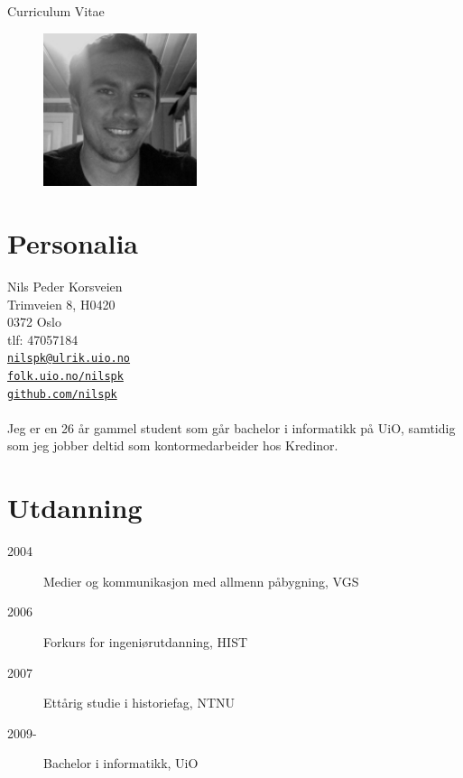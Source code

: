\documentclass[margin,line,a4paper]{resume}
\begin{document}
{\sc \Large Curriculum Vitae}
\begin{resume}
\vspace{0.5cm}
\begin{figure}
\vspace{-1cm}
\begin{center}
\includegraphics[width=0.4\textwidth]{me}
\end{center}
\vspace{-1cm}
\end{figure}

\section{\mysidestyle Personalia}%
Nils Peder Korsveien \\
Trimveien 8, H0420 \\
0372 Oslo \\
tlf: 47057184 \\
\href{mailto:nilspk@ulrik.uio.no}{\tt{nilspk@ulrik.uio.no}}\\
\href{http://folk.uio.no/nilspk}{\tt{folk.uio.no/nilspk}}\\
\href{http://github.com/nilspk}{\tt{github.com/nilspk}}\\
\\
Jeg er en 26 år gammel student som går bachelor i informatikk på
UiO, samtidig som jeg jobber deltid som kontormedarbeider hos Kredinor.


\section{\mysidestyle Utdanning}%
\begin{description}
\item[2004] Medier og kommunikasjon med allmenn påbygning, VGS
\item[2006] Forkurs for ingeniørutdanning, HIST
\item[2007] Ettårig studie i historiefag, NTNU
\item[2009-] Bachelor i informatikk, UiO
\end{description}


\end{resume}
\end{document}
